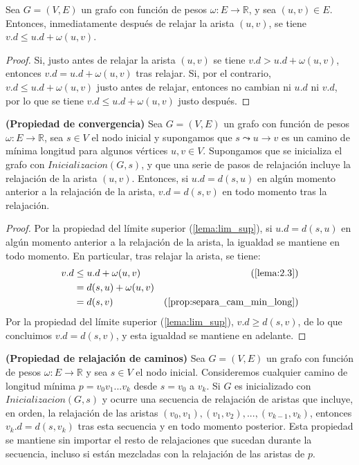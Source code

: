 \begin{lema}\label{lema:2.3}
	Sea $G=(V,E)$ un grafo con función de pesos $\omega : E\rightarrow \mathbb{R}$, y sea $(u,v)\in E$. Entonces, inmediatamente después de relajar la arista $(u,v)$, se tiene $v.d\leq u.d + \omega(u,v)$.
\end{lema}

\begin{proof}
	Si, justo antes de relajar la arista $(u,v)$ se tiene $v.d > u.d + \omega(u,v)$, entonces $v.d = u.d + \omega(u,v)$ tras relajar. Si, por el contrario, $v.d\leq u.d + \omega(u,v)$ justo antes de relajar, entonces no cambian ni $u.d$ ni $v.d$, por lo que se tiene $v.d\leq u.d + \omega(u,v)$ justo después.
\end{proof}

\begin{lema}\label{lema:convergencia}
	\textbf{(Propiedad de convergencia)} Sea $G=(V,E)$ un grafo con función de pesos $\omega : E\rightarrow \mathbb{R}$, sea $s\in V$ el nodo inicial y supongamos que $s \leadsto u \rightarrow v$ es un camino de mínima longitud para algunos vértices $u,v\in V$. Supongamos que se inicializa el grafo con $Inicializacion(G,s)$, y que una serie de pasos de relajación incluye la relajación de la arista $(u,v)$. Entonces, si $u.d=d(s,u)$ en algún momento anterior a la relajación de la arista, $v.d=d(s,v)$ en todo momento tras la relajación.
\end{lema}

\begin{proof}
	Por la propiedad del límite superior (\autoref{lema:lim_sup}), si $u.d=d(s,u)$ en algún momento anterior a la relajación de la arista, la igualdad se mantiene en todo momento. En particular, tras relajar la arista, se tiene:
	\begin{align*}
			v.d & \leq u.d + \omega(u,v) & (\textrm{\autoref{lema:2.3}}) \\
			& = d(s,u) + \omega(u,v) \\
			& = d(s,v) &(\textrm{\autoref{prop:separa_cam_min_long}})
	\end{align*}
	Por la propiedad del límite superior (\autoref{lema:lim_sup}), $v.d\geq d(s,v)$, de lo que concluimos $v.d = d(s,v)$, y esta igualdad se mantiene en adelante.
\end{proof}

\begin{lema}\label{lema:relaj_caminos}
	\textbf{(Propiedad de relajación de caminos)} Sea $G=(V,E)$ un grafo con función de pesos $\omega : E\rightarrow \mathbb{R}$ y sea $s\in V$ el nodo inicial. Consideremos cualquier camino de longitud mínima $p = v_0v_1...v_k$ desde $s=v_0$ a $v_k$. Si $G$ es inicializado con $Inicializacion(G,s)$ y ocurre una secuencia de relajación de aristas que incluye, en orden, la relajación de las aristas $(v_0,v_1),(v_1,v_2),...,(v_{k-1},v_k)$, entonces $v_k.d=d(s,v_k)$ tras esta secuencia y en todo momento posterior. Esta propiedad se mantiene sin importar el resto de relajaciones que sucedan durante la secuencia, incluso si están mezcladas con la relajación de las aristas de $p$.
\end{lema}


